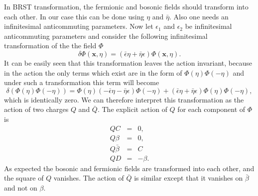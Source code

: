\documentclass[a4paper,11pt]{article}
\begin{document}
In BRST transformation, the fermionic and bosonic fields should
transform into each other. In our case this can be done using
$\eta$ and $\bar{\eta}$. Also one needs an infinitesimal
anticommuting parameters. Now let $\epsilon_1$ and $\epsilon_2$
be infinitesimal anticommuting parameters and consider the
following infinitesimal transformation of the the field $\Phi$
\begin{equation}\label{eq:a145}
\delta\Phi(\mathbf{x},\eta)=(\bar{\epsilon}\eta +
\bar{\eta}\epsilon) \Phi(\mathbf{x},\eta).
\end{equation}
It can be easily seen that this transformation leaves the action
invariant, because in the action the only terms which exist are
in the form of $\Phi(\eta)\Phi(-\eta)$ and under such a
transformation this term will become
\begin{equation}\label{eq:a146}
\delta(\Phi(\eta)\Phi(-\eta))=\Phi(\eta)(-\bar{\epsilon}\eta -
\bar{\eta}\epsilon) \Phi(-\eta)+(\bar{\epsilon}\eta +
\bar{\eta}\epsilon) \Phi(\eta)\Phi(-\eta),
\end{equation}
which is identically zero. We can therefore interpret this
transformation as the action of two charges $Q$ and $\bar{Q}$. The
explicit action of $Q$ for each component of $\Phi$ is
\begin{eqnarray}\label{eq:a147}
Q C&=&0,\nonumber\\
Q \beta&=&0,\nonumber\\
Q \bar{\beta}&=&C\nonumber\\
Q D&=&-\beta.
\end{eqnarray}
As expected the bosonic and fermionic fields are transformed into
each other, and the square of $Q$ vanishes. The action of
$\bar{Q}$ is similar except that it vanishes on $\bar{\beta}$ and
not on $\beta$.
\end{document}

